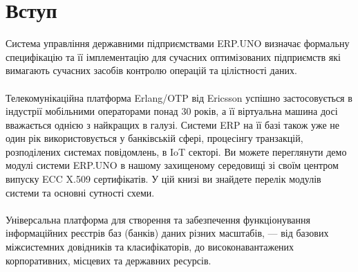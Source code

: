 \chapter{Вступ}

Система управління державними підприємствами ERP.UNO визначає формальну
специфікацію та її імплементацію для сучасних оптимізованих підприємств
які вимагають сучасних засобів контролю операцій та цілістності даних.
\\
\\
Телекомунікаційна платформа Erlang/OTP від Ericsson успішно застосовується
в індустрії мобільними операторами понад 30 років, а її віртуальна машина
досі вважається однією з найкращих в галузі. Системи ERP на її базі також
уже не один рік використовується у банківській сфері, процесінгу транзакцій,
розподілених системах повідомлень, в IoT секторі. Ви можете переглянути демо
модулі системи ERP.UNO в нашому захищеному середовищі зі своїм центром
випуску ECC X.509 сертифікатів. У цій книзі ви знайдете перелік модулів
системи та основні сутності схеми.
\\
\\
Універсальна платформа для створення та забезпечення функціонування
інформаційних реєстрів баз (банків) даних різних масштабів, — від базових
міжсистемних довідників та класифікаторів, до високонавантажених корпоративних,
місцевих та державних ресурсів.
\\
\\
